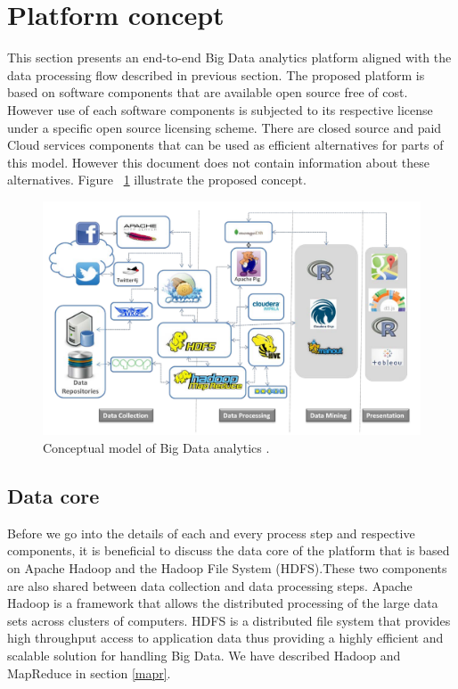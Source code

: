  \section{Platform concept}
 This section presents an end-to-end Big Data analytics platform aligned with the data processing flow described in previous section. The proposed platform is based on software components that are available open source free of cost. However use of each software components is subjected to its respective license under a specific open source licensing scheme. There are closed source and paid Cloud services components that can be used as efficient alternatives for parts of this model. However this document does not contain information about these alternatives. Figure ~\ref{fig:cplatform} illustrate the proposed concept.
 \begin{figure}[!h]
    \begin{center}
      \includegraphics[width=\textwidth]{images/cplatform.pdf}
      \caption{Conceptual model of Big Data analytics .}
      \label{fig:cplatform}
    \end{center}
  \end{figure} 
\subsection{Data core}
Before we go into the details of each and every process step and respective components, it is beneficial to discuss the data core of the platform that is based on Apache Hadoop and the Hadoop File System (HDFS).These two components are also shared between data collection and data processing steps.  Apache Hadoop is a framework that allows the distributed processing of the large data sets across clusters of computers. HDFS is a distributed file system that provides high throughput access to application data\cite{Apachehadoop} thus providing a highly efficient and scalable solution for handling Big Data. We have described Hadoop and MapReduce in section \ref{mapr}.
